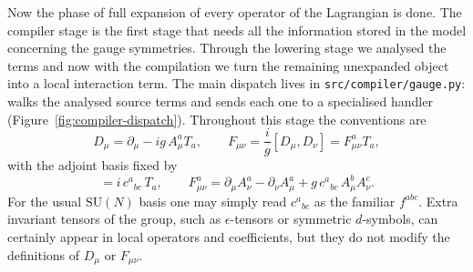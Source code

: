 Now the phase of full expansion of every operator of the Lagrangian is done. The compiler stage is the first stage that needs all the information stored in the model concerning the gauge symmetries. Through the lowering stage we analysed the terms and now with the compilation we turn the remaining unexpanded object into a local interaction term. The main dispatch lives in \texttt{src/compiler/gauge.py}:  walks the analysed source terms and sends each one to a specialised handler (Figure~\ref{fig:compiler-dispatch}). Throughout this stage the conventions are
\begin{equation}
    D_\mu = \partial_\mu - i g\, A_\mu^a T_a,
    \qquad
    F_{\mu\nu} = \frac{i}{g}[D_\mu,D_\nu]
    = F^a_{\mu\nu} T_a ,
    \label{eq:conventions}
\end{equation}
with the adjoint basis fixed by
\begin{equation}
    [T_b,T_c] = i\, c^{a}{}_{bc}\, T_a,
    \qquad
    F^a_{\mu\nu}
    = \partial_\mu A^a_\nu - \partial_\nu A^a_\mu + g\, c^{a}{}_{bc}\, A^b_\mu A^c_\nu .
    \label{eq:conventions-components}
\end{equation}
For the usual \(\mathrm{SU}(N)\) basis one may simply read \(c^{a}{}_{bc}\) as the familiar \(f^{abc}\). Extra invariant tensors of the group, such as \(\epsilon\)-tensors or symmetric \(d\)-symbols, can certainly appear in local operators and coefficients, but they do not modify the definitions of \(D_\mu\) or \(F_{\mu\nu}\).

